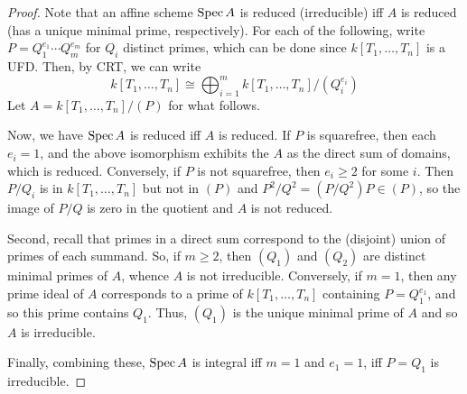 \begin{proof}
	Note that an affine scheme $\operatorname{Spec} A$ is reduced (irreducible) iff $A$ is reduced (has a unique minimal prime, respectively). For each of the following, write $P = Q_1^{e_1} \cdots Q_m^{e_m}$ for $Q_i$ distinct primes, which can be done since $k[T_1,\ldots,T_n]$ is a UFD. Then, by CRT, we can write
	\[ k[T_1,\ldots,T_n] \cong \bigoplus_{i=1}^m k[T_1,\ldots,T_n]/(Q_i^{e_i}) \]
	Let $A = k[T_1,\ldots,T_n]/(P)$ for what follows.
	
	Now, we have $\operatorname{Spec} A$ is reduced iff $A$ is reduced. If $P$ is squarefree, then each $e_i = 1$, and the above isomorphism exhibits the $A$ as the direct sum of domains, which is reduced. Conversely, if $P$ is not squarefree, then $e_i \geq 2$ for some $i$. Then $P/Q_i$ is in $k[T_1,\ldots,T_n]$ but not in $(P)$ and $P^2/Q^2 = (P/Q^2)P \in (P)$, so the image of $P/Q$ is zero in the quotient and $A$ is not reduced.
	
	Second, recall that primes in a direct sum correspond to the (disjoint) union of primes of each summand. So, if $m \geq 2$, then $(Q_1)$ and $(Q_2)$ are distinct minimal primes of $A$, whence $A$ is not irreducible. Conversely, if $m = 1$, then any prime ideal of $A$ corresponds to a prime of $k[T_1,\ldots,T_n]$ containing $P = Q_1^{e_1}$, and so this prime contains $Q_1$. Thus, $(Q_1)$ is the unique minimal prime of $A$ and so $A$ is irreducible.
	
	Finally, combining these, $\operatorname{Spec} A$ is integral iff $m=1$ and $e_1=1$, iff $P = Q_1$ is irreducible.
\end{proof}
